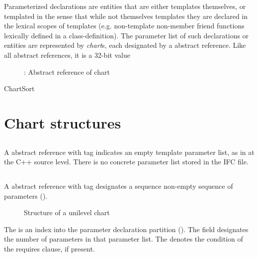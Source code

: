 \label{sec:ifc-charts}


Parameterized declarations are entities that are either templates themselves, or templated in the sense that while not themselves templates they are declared in the lexical scopes of templates (e.g. non-template non-member friend functions lexically defined in a class-definition).  The parameter list of such declarations or entities are represented by \emph{chart}s, each designated by a  abstract reference.    
Like all abstract references, it is a 32-bit value
\begin{figure}[htbp]
  \centering
  \caption{: Abstract reference of chart}
  \label{fig:ifc-chart-index}
\end{figure}

\begin{SortEnum}{ChartSort}
\end{SortEnum}

\section{Chart structures}
\label{sec:ifc:chart-structures}

\subsection{}
\label{sec:ifc:ChartSort:None}

A  abstract reference with tag  indicates an empty template parameter list, as in 
at the C++ source level.  There is no concrete parameter list stored in the IFC file.


\subsection{}
\label{sec:ifc:ChartSort:Unilevel}

A  abstract reference with tag  designates a sequence non-empty sequence of parameters ().

\begin{figure}[H]
	\centering
	\caption{Structure of a unilevel chart}
	\label{fig:ifc-unilevel-chart-structure}
\end{figure}
%
The  is an index into the parameter declaration partition ().
The  field designates the number of parameters in that parameter list.
The  denotes the condition of the requires clause, if present.

